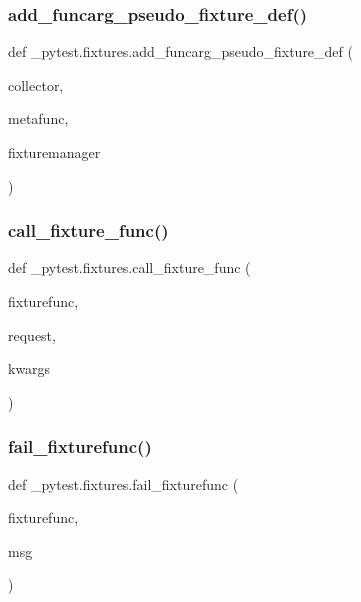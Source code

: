 \subsubsection{\texorpdfstring{add\+\_\+funcarg\+\_\+pseudo\+\_\+fixture\+\_\+def()}{add\_funcarg\_pseudo\_fixture\_def()}}
{\footnotesize\ttfamily def \+\_\+pytest.\+fixtures.\+add\+\_\+funcarg\+\_\+pseudo\+\_\+fixture\+\_\+def (\begin{DoxyParamCaption}\item[{}]{collector,  }\item[{}]{metafunc,  }\item[{}]{fixturemanager }\end{DoxyParamCaption})}

\mbox{\label{namespace__pytest_1_1fixtures_ae5ee458ad8ebcfb047be1634d070a471}} 
\subsubsection{\texorpdfstring{call\+\_\+fixture\+\_\+func()}{call\_fixture\_func()}}
{\footnotesize\ttfamily def \+\_\+pytest.\+fixtures.\+call\+\_\+fixture\+\_\+func (\begin{DoxyParamCaption}\item[{}]{fixturefunc,  }\item[{}]{request,  }\item[{}]{kwargs }\end{DoxyParamCaption})}

\mbox{\label{namespace__pytest_1_1fixtures_ab4db5207efee05fed81a09e34db5a9d8}} 
\subsubsection{\texorpdfstring{fail\+\_\+fixturefunc()}{fail\_fixturefunc()}}
{\footnotesize\ttfamily def \+\_\+pytest.\+fixtures.\+fail\+\_\+fixturefunc (\begin{DoxyParamCaption}\item[{}]{fixturefunc,  }\item[{}]{msg }\end{DoxyParamCaption})}

